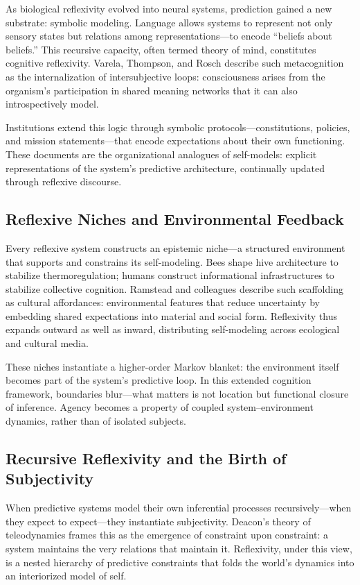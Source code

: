\documentclass[11pt,a4paper]{article}
\begin{document}
As biological reflexivity evolved into neural systems, prediction gained a new substrate: symbolic modeling.  Language allows systems to represent not only sensory states but relations among representations—to encode “beliefs about beliefs.”  This recursive capacity, often termed theory of mind, constitutes cognitive reflexivity.  Varela, Thompson, and Rosch \citep{VarelaThompsonRosch1991EmbodiedMind} describe such metacognition as the internalization of intersubjective loops: consciousness arises from the organism’s participation in shared meaning networks that it can also introspectively model.

Institutions extend this logic through symbolic protocols—constitutions, policies, and mission statements—that encode expectations about their own functioning.  These documents are the organizational analogues of self-models: explicit representations of the system’s predictive architecture, continually updated through reflexive discourse.

\subsection{Reflexive Niches and Environmental Feedback}

Every reflexive system constructs an epistemic niche—a structured environment that supports and constrains its self-modeling.  Bees shape hive architecture to stabilize thermoregulation; humans construct informational infrastructures to stabilize collective cognition.  Ramstead and colleagues \citep{Ramstead2016CulturalAffordances} describe such scaffolding as cultural affordances: environmental features that reduce uncertainty by embedding shared expectations into material and social form.  Reflexivity thus expands outward as well as inward, distributing self-modeling across ecological and cultural media.

These niches instantiate a higher-order Markov blanket: the environment itself becomes part of the system’s predictive loop.  In this extended cognition framework, boundaries blur—what matters is not location but functional closure of inference.  Agency becomes a property of coupled system–environment dynamics, rather than of isolated subjects.

\subsection{Recursive Reflexivity and the Birth of Subjectivity}

When predictive systems model their own inferential processes recursively—when they expect to expect—they instantiate subjectivity.  Deacon’s theory of teleodynamics \citep{Deacon2011IncompleteNature} frames this as the emergence of constraint upon constraint: a system maintains the very relations that maintain it.  Reflexivity, under this view, is a nested hierarchy of predictive constraints that folds the world’s dynamics into an interiorized model of self.
\end{document}
